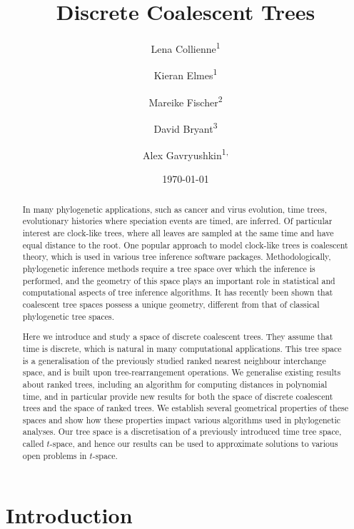 \documentclass[11pt]{amsart}
\title[Discrete Coalescent Trees]{Discrete Coalescent Trees}
\date{\today}
\author{Lena Collienne\textsuperscript{1}}
\author{Kieran Elmes\textsuperscript{1}}
\author{Mareike Fischer\textsuperscript{2}}
\author{David Bryant\textsuperscript{3}}
\author{Alex Gavryushkin\textsuperscript{1, \Letter}}
\begin{document}
\begin{abstract}
In many phylogenetic applications, such as cancer and virus evolution, time trees, evolutionary histories where speciation events are timed, are inferred.
Of particular interest are clock-like trees, where all leaves are sampled at the same time and have equal distance to the root.
One popular approach to model clock-like trees is coalescent theory, which is used in various tree inference software packages.
Methodologically, phylogenetic inference methods require a tree space over which the inference is performed, and the geometry of this space plays an important role in statistical and computational aspects of tree inference algorithms.
It has recently been shown that coalescent tree spaces possess a unique geometry, different from that of classical phylogenetic tree spaces.

Here we introduce and study a space of discrete coalescent trees.
They assume that time is discrete, which is natural in many computational applications.
This tree space is a generalisation of the previously studied ranked nearest neighbour interchange space, and is built upon tree-rearrangement operations.
We generalise existing results about ranked trees, including an algorithm for computing distances in polynomial time, and in particular provide new results for both the space of discrete coalescent trees and the space of ranked trees.
We establish several geometrical properties of these spaces and show how these properties impact various algorithms used in phylogenetic analyses.
Our tree space is a discretisation of a previously introduced time tree space, called $t$-space, and hence our results can be used to approximate solutions to various open problems in $t$-space.
\end{abstract}

\maketitle


\section{Introduction}
\end{document}
